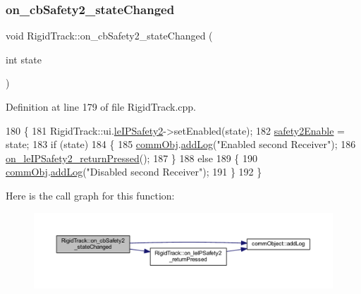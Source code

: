\subsubsection{\texorpdfstring{on\+\_\+cb\+Safety2\+\_\+state\+Changed}{on\_cbSafety2\_stateChanged}}
{\footnotesize\ttfamily void Rigid\+Track\+::on\+\_\+cb\+Safety2\+\_\+state\+Changed (\begin{DoxyParamCaption}\item[{int}]{state }\end{DoxyParamCaption})\hspace{0.3cm}{\ttfamily [slot]}}



Definition at line 179 of file Rigid\+Track.\+cpp.


\begin{DoxyCode}
180 \{
181     RigidTrack::ui.\hyperlink{class_ui___rigid_track_class_a70522f29594cbdc654ffed858b3e1fc5}{leIPSafety2}->setEnabled(state);
182     \hyperlink{main_8cpp_a436fb814ccc3f02617dade4dc6511143}{safety2Enable} = state;
183     \textcolor{keywordflow}{if} (state)
184     \{
185         \hyperlink{main_8cpp_af29e7fc07ae0979d5fb61b473241d33d}{commObj}.\hyperlink{classcomm_object_aec354c7099b3039083cc4224e071e022}{addLog}(\textcolor{stringliteral}{"Enabled second Receiver"});
186         \hyperlink{class_rigid_track_a555c536593d659b940de43cd2db8d6c1}{on\_leIPSafety2\_returnPressed}();
187     \}
188     \textcolor{keywordflow}{else}
189     \{
190         \hyperlink{main_8cpp_af29e7fc07ae0979d5fb61b473241d33d}{commObj}.\hyperlink{classcomm_object_aec354c7099b3039083cc4224e071e022}{addLog}(\textcolor{stringliteral}{"Disabled second Receiver"});
191     \}
192 \}
\end{DoxyCode}
Here is the call graph for this function\+:\nopagebreak
\begin{figure}[H]
\begin{center}
\leavevmode
\includegraphics[width=350pt]{class_rigid_track_ad6ba1cfe25f18ff0d9f5993aafa36d16_cgraph}
\end{center}
\end{figure}
\mbox{\label{class_rigid_track_a8f999fa968f4cc9fa548bdc8438b32c4}} 
